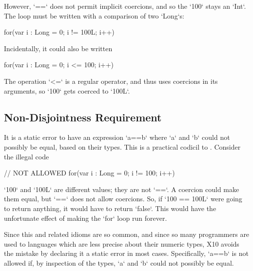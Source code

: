 However, \xcd`==` does not permit implicit coercions, and so the \xcd`100`
stays an \xcd`Int`.  The loop must be written with a comparison of two
\xcd`Long`s: 
\begin{xten}
for(var i : Long = 0; i != 100L; i++) {}
\end{xten}




Incidentally, it could also be written 
\begin{xten}
for(var i : Long = 0; i <= 100; i++) {}
\end{xten}

\begin{xten}

\end{xten}
The operation \xcd`<=` is a regular operator, and thus uses coercions in its
arguments, so \xcd`100` gets coerced to \xcd`100L`.  

\subsection{Non-Disjointness Requirement}

It is a static error to have an expression \xcd`a==b` where \xcd`a` and
\xcd`b` could not possibly be equal, based on their types.  This is a
practical codicil to .  Consider the illegal code 
\begin{xten}
// NOT ALLOWED
for(var i : Long = 0; i != 100; i++) 
\end{xten}

\xcd`100` and \xcd`100L` are different values; they are not \xcd`==`. A
coercion could make them equal, but \xcd`==` does not allow coercions. So, if
\xcd`100 == 100L` were going to return anything, it would have to return
\xcd`false`. This would have the unfortunate effect of making the \xcd`for`
loop run forever.

Since this and related idioms are so common, and since so many programmers are
used to languages which are less precise about their numeric types, X10 avoids
the mistake by declaring it a static error in most cases.  Specifically,
\xcd`a==b` is not allowed if, by inspection of the types, \xcd`a` and \xcd`b`
could not possibly be equal.

